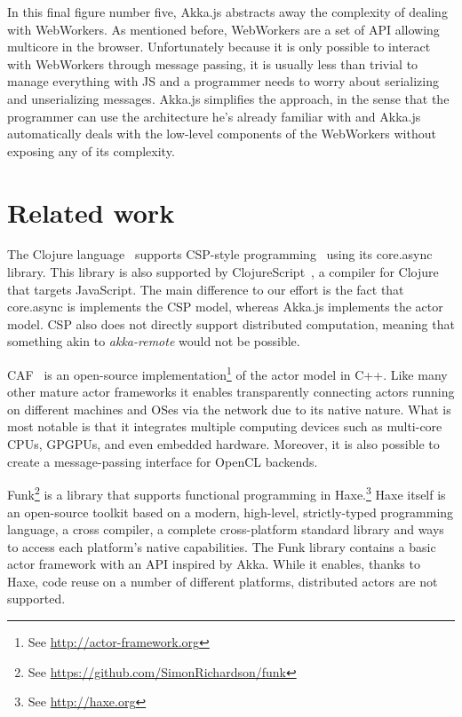 \documentclass{sig-alternate}
\begin{document}
In this final figure number five, Akka.js abstracts away the complexity of dealing with WebWorkers. As mentioned before, WebWorkers
are a set of API allowing multicore in the browser. Unfortunately because it is only possible to interact with WebWorkers 
through message passing, it is usually less than trivial to manage everything with JS and a programmer needs to worry
about serializing and unserializing messages. Akka.js simplifies the approach, in the sense that the programmer can use
the architecture he's already familiar with and Akka.js automatically deals with the low-level components of the WebWorkers
without exposing any of its complexity.


\section{Related work}\label{sec:related}

The Clojure language~\cite{Halloway09} supports CSP-style programming~\cite{Hoare78} using its
core.async library. This library is also supported by
ClojureScript~\cite{ClojureScript}, a compiler for Clojure that targets
JavaScript. The main difference to our effort is the fact that core.async is
implements the CSP model, whereas Akka.js implements the actor model. CSP also does not directly support distributed computation, meaning that something akin to \textit{akka-remote} would not be possible. 

CAF~\cite{CharoussetHS14} is an open-source implementation\footnote{See \url{http://actor-framework.org}} of the actor model in C++. Like many other mature actor frameworks it enables transparently connecting actors running on different machines and OSes via the network due to its native nature. What is most notable is that it integrates multiple computing devices such as multi-core CPUs, GPGPUs, and even embedded hardware. Moreover, it is also possible to create a message-passing interface for OpenCL backends.

Funk\footnote{See \url{https://github.com/SimonRichardson/funk}} is a library that supports functional programming in Haxe.\footnote{See \url{http://haxe.org}} Haxe itself is an open-source toolkit based on a modern, high-level, strictly-typed programming language, a cross compiler, a complete cross-platform standard library and ways to access each platform's native capabilities. The Funk library contains a basic actor framework with an API inspired by Akka. While it enables, thanks to Haxe, code reuse on a number of different platforms, distributed actors are not supported.
\end{document}
